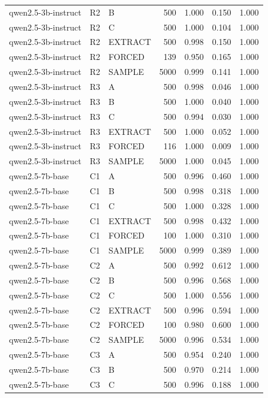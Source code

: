 \begin{table}
\begin{tabular}{lllrrrr}
qwen2.5-3b-instruct & R2 & B & 500 & 1.000 & 0.150 & 1.000 \\
qwen2.5-3b-instruct & R2 & C & 500 & 1.000 & 0.104 & 1.000 \\
qwen2.5-3b-instruct & R2 & EXTRACT & 500 & 0.998 & 0.150 & 1.000 \\
qwen2.5-3b-instruct & R2 & FORCED & 139 & 0.950 & 0.165 & 1.000 \\
qwen2.5-3b-instruct & R2 & SAMPLE & 5000 & 0.999 & 0.141 & 1.000 \\
qwen2.5-3b-instruct & R3 & A & 500 & 0.998 & 0.046 & 1.000 \\
qwen2.5-3b-instruct & R3 & B & 500 & 1.000 & 0.040 & 1.000 \\
qwen2.5-3b-instruct & R3 & C & 500 & 0.994 & 0.030 & 1.000 \\
qwen2.5-3b-instruct & R3 & EXTRACT & 500 & 1.000 & 0.052 & 1.000 \\
qwen2.5-3b-instruct & R3 & FORCED & 116 & 1.000 & 0.009 & 1.000 \\
qwen2.5-3b-instruct & R3 & SAMPLE & 5000 & 1.000 & 0.045 & 1.000 \\
qwen2.5-7b-base & C1 & A & 500 & 0.996 & 0.460 & 1.000 \\
qwen2.5-7b-base & C1 & B & 500 & 0.998 & 0.318 & 1.000 \\
qwen2.5-7b-base & C1 & C & 500 & 1.000 & 0.328 & 1.000 \\
qwen2.5-7b-base & C1 & EXTRACT & 500 & 0.998 & 0.432 & 1.000 \\
qwen2.5-7b-base & C1 & FORCED & 100 & 1.000 & 0.310 & 1.000 \\
qwen2.5-7b-base & C1 & SAMPLE & 5000 & 0.999 & 0.389 & 1.000 \\
qwen2.5-7b-base & C2 & A & 500 & 0.992 & 0.612 & 1.000 \\
qwen2.5-7b-base & C2 & B & 500 & 0.996 & 0.568 & 1.000 \\
qwen2.5-7b-base & C2 & C & 500 & 1.000 & 0.556 & 1.000 \\
qwen2.5-7b-base & C2 & EXTRACT & 500 & 0.996 & 0.594 & 1.000 \\
qwen2.5-7b-base & C2 & FORCED & 100 & 0.980 & 0.600 & 1.000 \\
qwen2.5-7b-base & C2 & SAMPLE & 5000 & 0.996 & 0.534 & 1.000 \\
qwen2.5-7b-base & C3 & A & 500 & 0.954 & 0.240 & 1.000 \\
qwen2.5-7b-base & C3 & B & 500 & 0.970 & 0.214 & 1.000 \\
qwen2.5-7b-base & C3 & C & 500 & 0.996 & 0.188 & 1.000 \\

\end{tabular}
\end{table}
